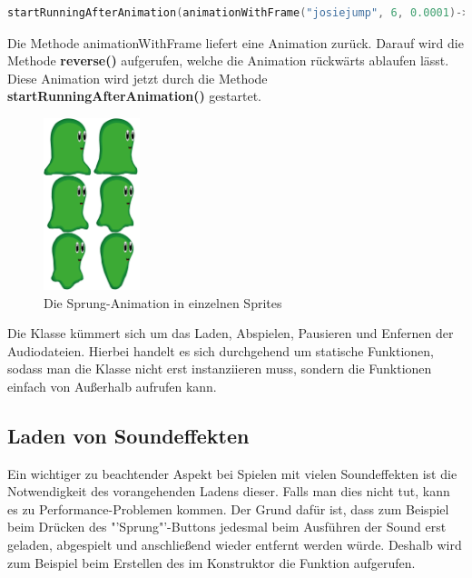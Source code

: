 \begin{lstlisting}[label=lst:build_josie_animation_reverse,
				   language=C++,
				   firstnumber=96,
				   caption=Sequence Umkehren ( LevelPlayer.cpp )]
startRunningAfterAnimation(animationWithFrame("josiejump", 6, 0.0001)->reverse())
\end{lstlisting}

Die Methode animationWithFrame liefert eine Animation zurück. Darauf wird die Methode \textbf{reverse()} aufgerufen, welche die Animation rückwärts ablaufen lässt. Diese Animation wird jetzt durch die Methode \textbf{startRunningAfterAnimation()} gestartet. 

\begin{figure}[H]
  \centering
  \includegraphics[height=5cm]{resources/josiejump}
  \caption{Die Sprung-Animation in einzelnen Sprites}
  \label{fig:josie_jump} 
\end{figure}



\label{sec:4_Audiounit}
Die Klasse  kümmert sich um das Laden, Abspielen, Pausieren und Enfernen der Audiodateien. Hierbei handelt es sich durchgehend um statische Funktionen, sodass man die Klasse nicht erst instanziieren muss, sondern die Funktionen einfach von Außerhalb aufrufen kann.

\subsection{Laden von Soundeffekten}
Ein wichtiger zu beachtender Aspekt bei Spielen mit vielen Soundeffekten ist die Notwendigkeit des vorangehenden Ladens dieser. Falls man dies nicht tut, kann es zu Performance-Problemen kommen. Der Grund dafür ist, dass zum Beispiel beim Drücken des "'Sprung"'-Buttons jedesmal beim Ausführen der Sound erst geladen, abgespielt und anschließend wieder entfernt werden würde. Deshalb wird zum Beispiel beim Erstellen des  im Konstruktor die Funktion  aufgerufen.

